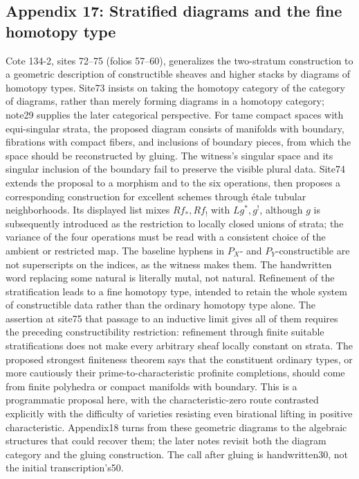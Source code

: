 \documentclass[10pt,oneside]{book}
\begin{document}
\subsection*{Appendix 17: Stratified diagrams and the fine homotopy type}
Cote 134-2, sites 72--75 (folios 57--60), generalizes the two-stratum construction to a geometric description of constructible sheaves and higher stacks by diagrams of homotopy types. Site73 insists on taking the homotopy category of the category of diagrams, rather than merely forming diagrams in a homotopy category; note29 supplies the later categorical perspective. For tame compact spaces with equi-singular strata, the proposed diagram consists of manifolds with boundary, fibrations with compact fibers, and inclusions of boundary pieces, from which the space should be reconstructed by gluing. The witness's singular space and its singular inclusion of the boundary fail to preserve the visible plural data. Site74 extends the proposal to a morphism and to the six operations, then proposes a corresponding construction for excellent schemes through étale tubular neighborhoods. Its displayed list mixes $Rf_*,Rf_!$ with $Lg^*,g^!$, although $g$ is subsequently introduced as the restriction to locally closed unions of strata; the variance of the four operations must be read with a consistent choice of the ambient or restricted map. The baseline hyphens in $P_X$- and $P_Y$-constructible are not superscripts on the indices, as the witness makes them. The handwritten word replacing some natural is literally mutal, not natural. Refinement of the stratification leads to a fine homotopy type, intended to retain the whole system of constructible data rather than the ordinary homotopy type alone. The assertion at site75 that passage to an inductive limit gives all of them requires the preceding constructibility restriction: refinement through finite suitable stratifications does not make every arbitrary sheaf locally constant on strata. The proposed strongest finiteness theorem says that the constituent ordinary types, or more cautiously their prime-to-characteristic profinite completions, should come from finite polyhedra or compact manifolds with boundary. This is a programmatic proposal here, with the characteristic-zero route contrasted explicitly with the difficulty of varieties resisting even birational lifting in positive characteristic. Appendix18 turns from these geometric diagrams to the algebraic structures that could recover them; the later notes revisit both the diagram category and the gluing construction. The call after gluing is handwritten30, not the initial transcription's50.
\end{document}
